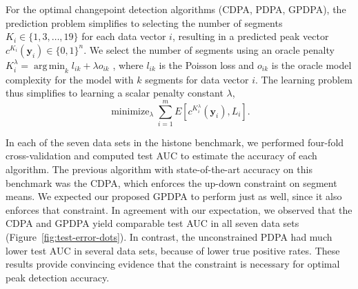 \documentclass{article}
\DeclareMathOperator*{\argmin}{arg\,min}
\DeclareMathOperator*{\minimize}{minimize}
\begin{document}

For the optimal changepoint detection algorithms (CDPA, PDPA, GPDPA),
the prediction problem simplifies to selecting the number of segments
$K_i\in \{1, 3,\dots, 19\}$ for each data vector $i$, resulting in a
predicted peak vector $c^{K_i}(\mathbf y_i)\in\{0,1\}^n$. We select the
number of segments using an oracle penalty
$K_i^\lambda=\argmin_k l_{ik} + \lambda o_{ik}$
\citep{cleynen2013segmentation}, where $l_{ik}$ is the Poisson loss and
$o_{ik}$ is the oracle model complexity for the model with $k$
segments for data vector $i$. 
The learning problem thus simplifies to learning a scalar
penalty constant $\lambda$,
\begin{equation}
  \label{eq:learn-lambda}
  \minimize_{\lambda}
  \sum_{i=1}^m E\left[
    c^{K_i^\lambda}(\mathbf y_i), 
    L_i\right].
\end{equation}


In each of the seven data sets in the histone 
benchmark,
we performed four-fold cross-validation and computed test AUC to
estimate the accuracy of each algorithm. The previous algorithm with
state-of-the-art accuracy on this benchmark was the CDPA, which
enforces the up-down constraint on segment means. We expected our
proposed GPDPA to perform just as well, since it also enforces that
constraint. In agreement with our expectation, we observed that the
CDPA and GPDPA yield comparable test AUC in all seven data sets
(Figure~\ref{fig:test-error-dots}). In contrast, the unconstrained
PDPA had much lower test AUC in several data sets, because of lower
true positive rates. These results provide convincing
evidence that the constraint is necessary for optimal peak detection
accuracy.
\end{document}
